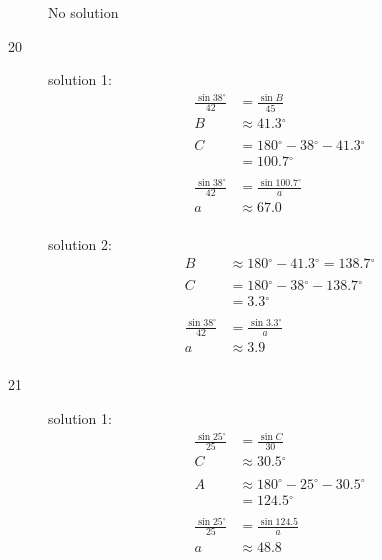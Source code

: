 \documentclass{exam}
\newcommand{\dg}{\ensuremath{^\circ}}
\begin{document}
\begin{description}
        No solution

      \item[20] 
        solution 1:
        \begin{align*}
          \frac{\sin 38 \dg}{42} & = \frac{\sin B}{45} \\
          B                      & \approx \boxed{ 41.3 \dg } \\
          \\
          C & = 180 \dg - 38 \dg - 41.3 \dg  \\
            & = \boxed{ 100.7 \dg } \\ 
          \\
          \frac{\sin 38 \dg}{42} & = \frac{\sin 100.7 \dg}{a} \\
          a                      & \approx \boxed{ 67.0 } \\
        \end{align*}

        solution 2:
        \begin{align*}
          B & \approx 180 \dg - 41.3 \dg = 138.7 \dg \\
          \\
          C & = 180 \dg - 38 \dg - 138.7 \dg  \\
            & = \boxed{ 3.3 \dg } \\ 
          \\
          \frac{\sin 38 \dg}{42} & = \frac{\sin 3.3 \dg}{a} \\
          a                      & \approx \boxed{ 3.9 } \\
        \end{align*}

      \item[21] 
        solution 1:
        \begin{align*}
          \frac{\sin 25 \dg}{25} & = \frac{\sin C}{30} \\
          C                      & \approx \boxed{ 30.5 \dg } \\
          \\
          A & \approx 180 \dg - 25 \dg - 30.5 \dg \\
            & = \boxed{ 124.5 \dg } \\
          \\
          \frac{\sin 25 \dg}{25} & = \frac{\sin 124.5}{a} \\
          a                      & \approx \boxed{ 48.8 } \\
        \end{align*}


\end{description}
\end{document}
